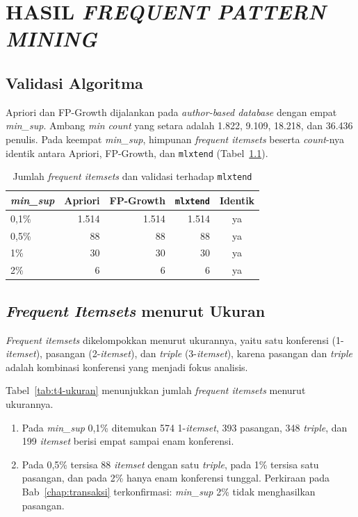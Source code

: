 \chapter{HASIL \textit{FREQUENT PATTERN MINING}}
\label{chap:fpm}\label{sec:hasil-t4}

\section{Validasi Algoritma}
\label{sec:hasil-t4-validasi}
Apriori \cite{agrawal1994} dan FP-Growth \cite{han2000} dijalankan pada \textit{author-based database} dengan empat \textit{min\_sup}. Ambang \textit{min count} yang setara adalah 1.822, 9.109, 18.218, dan 36.436 penulis. Pada keempat \textit{min\_sup}, himpunan \textit{frequent itemsets} beserta \textit{count}-nya identik antara Apriori, FP-Growth, dan \texttt{mlxtend} (Tabel~\ref{tab:t4-validasi}).

\begin{table}[!htb]
\caption{Jumlah \textit{frequent itemsets} dan validasi terhadap \texttt{mlxtend}}
\label{tab:t4-validasi}
\small
\begin{tabular*}{\textwidth}{@{\extracolsep{\fill}}@{}lrrrc@{}}
\toprule
\textbf{\textit{min\_sup}} & \textbf{Apriori} & \textbf{FP-Growth} & \textbf{\texttt{mlxtend}} & \textbf{Identik} \\
\midrule
0,1\% & 1.514 & 1.514 & 1.514 & ya \\
0,5\% & 88 & 88 & 88 & ya \\
1\% & 30 & 30 & 30 & ya \\
2\% & 6 & 6 & 6 & ya \\
\bottomrule
\end{tabular*}
\end{table}

\section{\textit{Frequent Itemsets} menurut Ukuran}
\label{sec:hasil-t4-ukuran}
\textit{Frequent itemsets} dikelompokkan menurut ukurannya, yaitu satu konferensi (1-\textit{itemset}), pasangan (2-\textit{itemset}), dan \textit{triple} (3-\textit{itemset}), karena pasangan dan \textit{triple} adalah kombinasi konferensi yang menjadi fokus analisis.

Tabel~\ref{tab:t4-ukuran} menunjukkan jumlah \textit{frequent itemsets} menurut ukurannya.
\begin{enumerate}
\item Pada \textit{min\_sup} 0,1\% ditemukan 574 1-\textit{itemset}, 393 pasangan, 348 \textit{triple}, dan 199 \textit{itemset} berisi empat sampai enam konferensi.
\item Pada 0,5\% tersisa 88 \textit{itemset} dengan satu \textit{triple}, pada 1\% tersisa satu pasangan, dan pada 2\% hanya enam konferensi tunggal. Perkiraan pada Bab~\ref{chap:transaksi} terkonfirmasi: \textit{min\_sup} 2\% tidak menghasilkan pasangan.
\end{enumerate}

